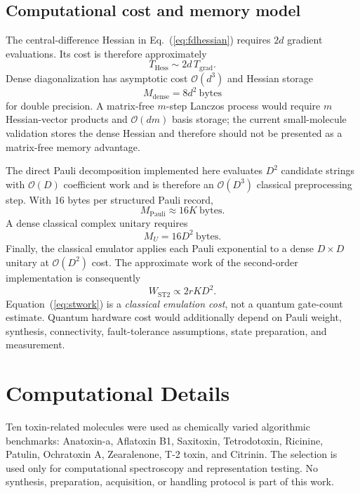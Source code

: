 \documentclass[aip,jcp,reprint,amsmath,amssymb,floatfix]{revtex4-2}
\begin{document}
\subsection{Computational cost and memory model}
The central-difference Hessian in Eq.~(\ref{eq:fdhessian}) requires $2d$ gradient evaluations. Its cost is therefore approximately
\begin{equation}
T_{\mathrm{Hess}}\sim 2d\,T_{\mathrm{grad}}.
\end{equation}
Dense diagonalization has asymptotic cost $\mathcal{O}(d^3)$ and Hessian storage
\begin{equation}
M_{\mathrm{dense}}=8d^2\ \mathrm{bytes}
\label{eq:densemem}
\end{equation}
for double precision. A matrix-free $m$-step Lanczos process would require $m$ Hessian-vector products and $\mathcal{O}(dm)$ basis storage; the current small-molecule validation stores the dense Hessian and therefore should not be presented as a matrix-free memory advantage.

The direct Pauli decomposition implemented here evaluates $D^2$ candidate strings with $\mathcal{O}(D)$ coefficient work and is therefore an $\mathcal{O}(D^3)$ classical preprocessing step. With 16 bytes per structured Pauli record,
\begin{equation}
M_{\mathrm{Pauli}}\approx 16K\ \mathrm{bytes}.
\label{eq:paulimem}
\end{equation}
A dense classical complex unitary requires
\begin{equation}
M_U=16D^2\ \mathrm{bytes}.
\label{eq:unitarymem}
\end{equation}
Finally, the classical emulator applies each Pauli exponential to a dense $D\times D$ unitary at $\mathcal{O}(D^2)$ cost. The approximate work of the second-order implementation is consequently
\begin{equation}
W_{\mathrm{ST2}}\propto 2rKD^2.
\label{eq:stwork}
\end{equation}
Equation~(\ref{eq:stwork}) is a \emph{classical emulation cost}, not a quantum gate-count estimate. Quantum hardware cost would additionally depend on Pauli weight, synthesis, connectivity, fault-tolerance assumptions, state preparation, and measurement.\cite{Trenev2025,Malpathak2026}

\section{Computational Details}
Ten toxin-related molecules were used as chemically varied algorithmic benchmarks: Anatoxin-a, Aflatoxin B1, Saxitoxin, Tetrodotoxin, Ricinine, Patulin, Ochratoxin A, Zearalenone, T-2 toxin, and Citrinin. The selection is used only for computational spectroscopy and representation testing. No synthesis, preparation, acquisition, or handling protocol is part of this work.
\end{document}
